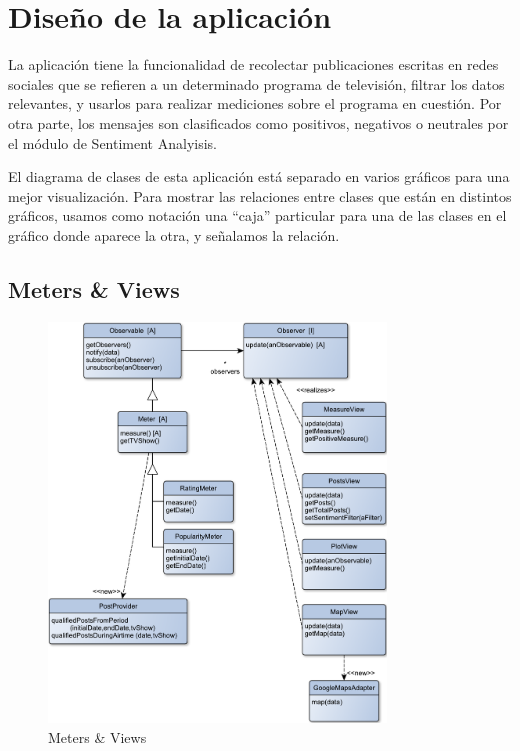 
\section{Diseño de la aplicación}


La aplicación tiene la funcionalidad de recolectar publicaciones escritas en redes sociales que se refieren a un determinado programa de televisión, filtrar los datos relevantes, y usarlos para realizar mediciones sobre el programa en cuestión. 
Por otra parte, los mensajes son clasificados como positivos, negativos o neutrales por el módulo de Sentiment Analyisis.
\bigskip

El diagrama de clases de esta aplicación está separado en varios gráficos para una mejor visualización. Para mostrar las relaciones entre clases que están en distintos gráficos, usamos como notación una ``caja'' particular para una de las clases en el gráfico donde aparece la otra, y señalamos la relación.

\subsection{Meters \& Views}

\begin{figure}[H]
\centering
\includegraphics[width=0.8\textwidth]{graph/clase/meters.pdf}
\caption{Meters \& Views}
\end{figure}


